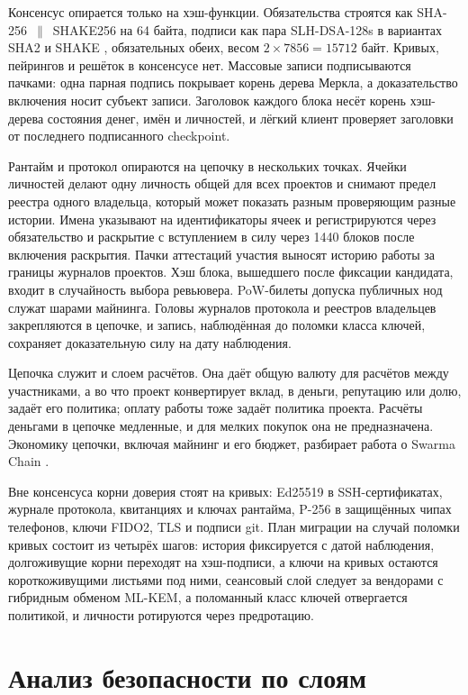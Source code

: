 \documentclass[10pt,a4paper]{article}
\begin{document}
Консенсус опирается только на хэш-функции. Обязательства строятся как SHA-256~$\|$~SHAKE256 на 64 байта, подписи как пара SLH-DSA-128s в вариантах SHA2 и SHAKE \cite{fips205}, обязательных обеих, весом $2\times7856=15712$ байт. Кривых, пейрингов и решёток в консенсусе нет. Массовые записи подписываются пачками: одна парная подпись покрывает корень дерева Меркла, а доказательство включения носит субъект записи. Заголовок каждого блока несёт корень хэш-дерева состояния денег, имён и личностей, и лёгкий клиент проверяет заголовки от последнего подписанного checkpoint.

Рантайм и протокол опираются на цепочку в нескольких точках. Ячейки личностей делают одну личность общей для всех проектов и снимают предел реестра одного владельца, который может показать разным проверяющим разные истории. Имена указывают на идентификаторы ячеек и регистрируются через обязательство и раскрытие с вступлением в силу через 1440 блоков после включения раскрытия. Пачки аттестаций участия выносят историю работы за границы журналов проектов. Хэш блока, вышедшего после фиксации кандидата, входит в случайность выбора ревьювера. PoW-билеты допуска публичных нод служат шарами майнинга. Головы журналов протокола и реестров владельцев закрепляются в цепочке, и запись, наблюдённая до поломки класса ключей, сохраняет доказательную силу на дату наблюдения.

Цепочка служит и слоем расчётов. Она даёт общую валюту для расчётов между участниками, а во что проект конвертирует вклад, в деньги, репутацию или долю, задаёт его политика; оплату работы тоже задаёт политика проекта. Расчёты деньгами в цепочке медленные, и для мелких покупок она не предназначена. Экономику цепочки, включая майнинг и его бюджет, разбирает работа о Swarma Chain \cite{swarmachain}.

Вне консенсуса корни доверия стоят на кривых: Ed25519 в SSH-сертификатах, журнале протокола, квитанциях и ключах рантайма, P-256 в защищённых чипах телефонов, ключи FIDO2, TLS и подписи git. План миграции на случай поломки кривых состоит из четырёх шагов: история фиксируется с датой наблюдения, долгоживущие корни переходят на хэш-подписи, а ключи на кривых остаются короткоживущими листьями под ними, сеансовый слой следует за вендорами с гибридным обменом ML-KEM, а поломанный класс ключей отвергается политикой, и личности ротируются через предротацию.

\section{Анализ безопасности по слоям}
\label{sec:analysis}
\end{document}

